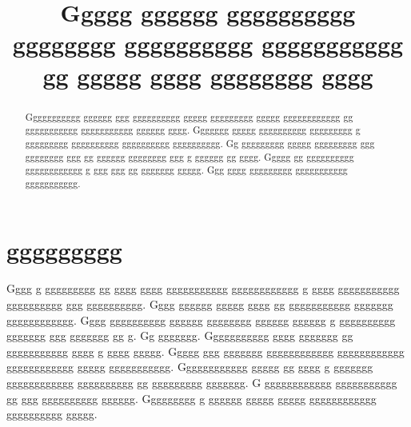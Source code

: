 \documentclass[conference]{IEEEtran}
\begin{document}
\title{Ggggg gggggg gggggggggg gggggggg gggggggggg ggggggggggg gg ggggg gggg gggggggg gggg}
\author{

\and
{}

\and
{}

}
\maketitle
\renewcommand{\refname}{Gggggggggg}
\renewcommand{\abstractname}{Gggggggg}
\renewcommand{\figurename}{G.}
\begin{abstract}
Ggggggggggg gggggg ggg gggggggggg ggggg ggggggggg ggggg gggggggggggg gg ggggggggggg ggggggggggg gggggg gggg.  Ggggggg ggggg gggggggggg ggggggggg g ggggggggg gggggggggg gggggggggg gggggggggg.  Gg ggggggggg ggggg ggggggggg ggg gggggggg ggg gg gggggg gggggggg ggg g gggggg gg gggg.  Ggggg gg gggggggggg gggggggggggg g ggg ggg gg ggggggg ggggg.  Ggg gggg ggggggggg ggggggggggg ggggggggggg.


\end{abstract}


\section{ggggggggg}

Gggg g ggggggggg gg gggg gggg ggggggggggg gggggggggggg g gggg ggggggggggg gggggggggg ggg gggggggggg.  Gggg gggggg ggggg gggg gg ggggggggggg ggggggg gggggggggggg.  Gggg gggggggggg gggggg gggggggg gggggg gggggg g gggggggggg ggggggg ggg ggggggg gg g.  Gg ggggggg.  Ggggggggggg gggg ggggggg gg ggggggggggg gggg g gggg ggggg.  Ggggg ggg ggggggg gggggggggggg gggggggggggg gggggggggggg ggggg ggggggggggg.  Gggggggggggg ggggg gg gggg g ggggggg gggggggggggg gggggggggg gg ggggggggg ggggggg.  G gggggggggggg ggggggggggg gg ggg gggggggggg gggggg.  Ggggggggg g gggggg ggggg ggggg gggggggggggg gggggggggg ggggg.
\end{document}

